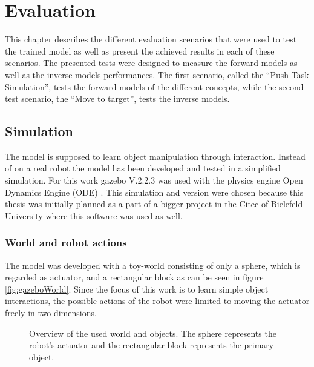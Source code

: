 \chapter{Evaluation\label{chap:evaluation}}



This chapter describes the different evaluation scenarios that were used to test the trained model 
as well as present the achieved results in each of these scenarios. The presented tests were 
designed to measure the forward models as well as the inverse models performances. The first 
scenario, called the \enquote{Push Task Simulation}, tests the forward models of the different 
concepts, while the second test scenario, the \enquote{Move to target}, tests the inverse models.


\section{Simulation\label{sec:simulation}}

The model is supposed to learn object manipulation through interaction. Instead of on a real robot the model has been developed and tested in a simplified simulation. For this work gazebo \cite{gazebo} V.2.2.3 was used with the physics engine Open Dynamics Engine (ODE) \cite{ode}. This simulation and version were chosen because this thesis was initially planned as a part of a bigger project in the Citec of Bielefeld University where this software was used as well. 

\subsection{World and robot actions \label{sec:environment}}%

The model was developed with a toy-world consisting of only a sphere, which is 
regarded as actuator, and a rectangular block as can be seen in figure 
\ref{fig:gazeboWorld}.
Since the focus of this work is to learn simple object interactions, the 
possible actions of the robot were limited to moving the actuator freely in two 
dimensions.

\begin{figure} %
	\caption{Overview of the used world and objects. The sphere represents the 
		robot's actuator and the rectangular block represents the primary object.}
	\label{fig:gazeboWOrld}
\end{figure}



